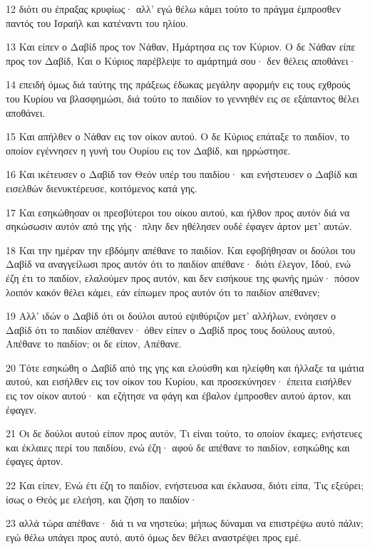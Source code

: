 \par 12 διότι συ έπραξας κρυφίως· αλλ' εγώ θέλω κάμει τούτο το πράγμα έμπροσθεν παντός του Ισραήλ και κατέναντι του ηλίου.
\par 13 Και είπεν ο Δαβίδ προς τον Νάθαν, Ημάρτησα εις τον Κύριον. Ο δε Νάθαν είπε προς τον Δαβίδ, Και ο Κύριος παρέβλεψε το αμάρτημά σου· δεν θέλεις αποθάνει·
\par 14 επειδή όμως διά ταύτης της πράξεως έδωκας μεγάλην αφορμήν εις τους εχθρούς του Κυρίου να βλασφημώσι, διά τούτο το παιδίον το γεννηθέν εις σε εξάπαντος θέλει αποθάνει.
\par 15 Και απήλθεν ο Νάθαν εις τον οίκον αυτού. Ο δε Κύριος επάταξε το παιδίον, το οποίον εγέννησεν η γυνή του Ουρίου εις τον Δαβίδ, και ηρρώστησε.
\par 16 Και ικέτευσεν ο Δαβίδ τον Θεόν υπέρ του παιδίου· και ενήστευσεν ο Δαβίδ και εισελθών διενυκτέρευσε, κοιτόμενος κατά γης.
\par 17 Και εσηκώθησαν οι πρεσβύτεροι του οίκου αυτού, και ήλθον προς αυτόν διά να σηκώσωσιν αυτόν από της γής· πλην δεν ηθέλησεν ουδέ έφαγεν άρτον μετ' αυτών.
\par 18 Και την ημέραν την εβδόμην απέθανε το παιδίον. Και εφοβήθησαν οι δούλοι του Δαβίδ να αναγγείλωσι προς αυτόν ότι το παιδίον απέθανε· διότι έλεγον, Ιδού, ενώ έζη έτι το παιδίον, ελαλούμεν προς αυτόν, και δεν εισήκουε της φωνής ημών· πόσον λοιπόν κακόν θέλει κάμει, εάν είπωμεν προς αυτόν ότι το παιδίον απέθανεν;
\par 19 Αλλ' ιδών ο Δαβίδ ότι οι δούλοι αυτού εψιθύριζον μετ' αλλήλων, ενόησεν ο Δαβίδ ότι το παιδίον απέθανεν· όθεν είπεν ο Δαβίδ προς τους δούλους αυτού, Απέθανε το παιδίον; οι δε είπον, Απέθανε.
\par 20 Τότε εσηκώθη ο Δαβίδ από της γης και ελούσθη και ηλείφθη και ήλλαξε τα ιμάτια αυτού, και εισήλθεν εις τον οίκον του Κυρίου, και προσεκύνησεν· έπειτα εισήλθεν εις τον οίκον αυτού· και εζήτησε να φάγη και έβαλον έμπροσθεν αυτού άρτον, και έφαγεν.
\par 21 Οι δε δούλοι αυτού είπον προς αυτόν, Τι είναι τούτο, το οποίον έκαμες; ενήστευες και έκλαιες περί του παιδίου, ενώ έζη· αφού δε απέθανε το παιδίον, εσηκώθης και έφαγες άρτον.
\par 22 Και είπεν, Ενώ έτι έζη το παιδίον, ενήστευσα και έκλαυσα, διότι είπα, Τις εξεύρει; ίσως ο Θεός με ελεήση, και ζήση το παιδίον·
\par 23 αλλά τώρα απέθανε· διά τι να νηστεύω; μήπως δύναμαι να επιστρέψω αυτό πάλιν; εγώ θέλω υπάγει προς αυτό, αυτό όμως δεν θέλει αναστρέψει προς εμέ.
